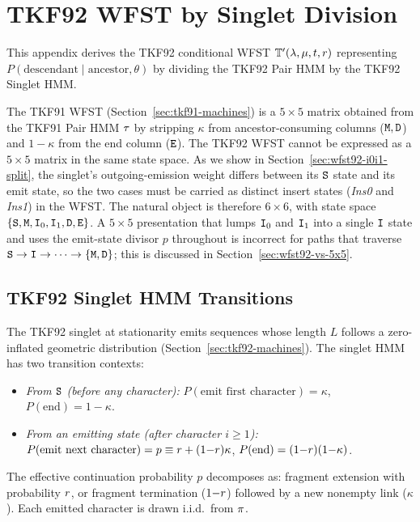 
\section{TKF92 WFST by Singlet Division}
\label{sec:tkf92-wfst}

This appendix derives the TKF92 conditional WFST
$\mathbb{T}'(\lambda,\mu,t,r)$
representing $P(\text{descendant} \mid \text{ancestor}, \theta)$
by dividing the TKF92 Pair HMM by the TKF92 Singlet HMM.

The TKF91 WFST (Section~\ref{sec:tkf91-machines}) is a $5{\times}5$
matrix obtained from the TKF91 Pair HMM $\tau$ by stripping
$\kappa$ from ancestor-consuming columns (${\tt M},{\tt D}$) and $1{-}\kappa$
from the end column (${\tt E}$).
The TKF92 WFST cannot be expressed as a $5{\times}5$ matrix in the same
state space.  As we show in Section~\ref{sec:wfst92-i0i1-split},
the singlet's outgoing-emission weight differs between its
${\tt S}$ state and its emit state, so the two cases must be carried as
distinct insert states (\emph{Ins0} and \emph{Ins1}) in the WFST.
The natural object is therefore $6{\times}6$, with state space
$\{{\tt S},{\tt M},{\tt I}_0,{\tt I}_1,{\tt D},{\tt E}\}$.
A $5{\times}5$ presentation that lumps ${\tt I}_0$ and ${\tt I}_1$ into a
single ${\tt I}$ state and uses the emit-state divisor $p$ throughout is
incorrect for paths that traverse ${\tt S}\to{\tt I}\to\cdots\to\{{\tt M},{\tt D}\}$;
this is discussed in Section~\ref{sec:wfst92-vs-5x5}.

\subsection{TKF92 Singlet HMM Transitions}

The TKF92 singlet at stationarity emits sequences whose length $L$
follows a zero-inflated geometric distribution
(Section~\ref{sec:tkf92-machines}).
The singlet HMM has two transition contexts:

\begin{itemize}[nosep]
\item \emph{From ${\tt S}$ (before any character):}
  $P(\text{emit first character}) = \kappa$,\quad
  $P(\text{end}) = 1-\kappa$.

\item \emph{From an emitting state (after character $i \geq 1$):}
  $P(\text{emit next character}) = p \equiv r + (1{-}r)\kappa$,\quad
  $P(\text{end}) = (1{-}r)(1{-}\kappa)$.
\end{itemize}
The effective continuation probability $p$ decomposes as:
fragment extension with probability $r$,
or fragment termination ($1{-}r$) followed by a new nonempty link ($\kappa$).
Each emitted character is drawn i.i.d.\ from $\pi$.

